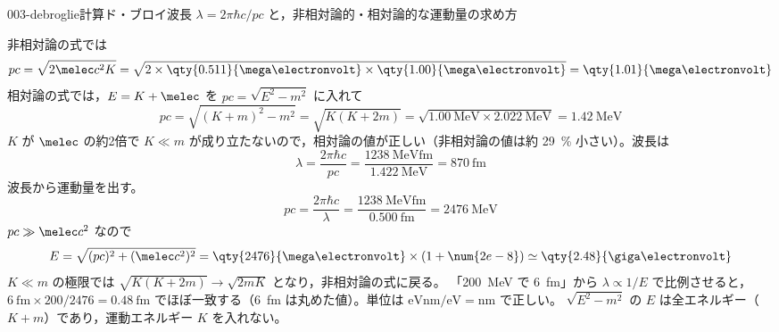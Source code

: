 \documentclass[uplatex,dvipdfmx,a4paper,11pt]{jsarticle}
\begin{document}
\begin{mondai}{003-debroglie}{計算}{ド・ブロイ波長 $\lambda=2\pi\hbar c/pc$ と，非相対論的・相対論的な運動量の求め方}
\begin{tadashii}
 非相対論の式では
\[ pc=\sqrt{2\melec c^2K}=\sqrt{2\times\qty{0.511}{\mega\electronvolt}\times\qty{1.00}{\mega\electronvolt}}=\qty{1.01}{\mega\electronvolt} \]
相対論の式では，$E=K+\melec$ を $pc=\sqrt{E^2-m^2}$ に入れて
\[ pc=\sqrt{(K+m)^2-m^2}=\sqrt{K(K+2m)}=\sqrt{\qty{1.00}{\mega\electronvolt}\times\qty{2.022}{\mega\electronvolt}}=\qty{1.42}{\mega\electronvolt} \]
$K$ が $\melec$ の約2倍で $K\ll m$ が成り立たないので，相対論の値が正しい（非相対論の値は約 \qty{29}{\percent} 小さい）。波長は
\[ \lambda=\frac{2\pi\hbar c}{pc}=\frac{\qty{1238}{\mega\electronvolt\femto\metre}}{\qty{1.422}{\mega\electronvolt}}=\qty{870}{\femto\metre} \]
 波長から運動量を出す。
\[ pc=\frac{2\pi\hbar c}{\lambda}=\frac{\qty{1238}{\mega\electronvolt\femto\metre}}{\qty{0.500}{\femto\metre}}=\qty{2476}{\mega\electronvolt} \]
$pc\gg\melec c^2$ なので
\[ E=\sqrt{(pc)^2+(\melec c^2)^2}=\qty{2476}{\mega\electronvolt}\times\left(1+\num{2e-8}\right)\simeq\qty{2.48}{\giga\electronvolt} \]
\kenzan {} $K\ll m$ の極限では $\sqrt{K(K+2m)}\to\sqrt{2mK}$ となり，非相対論の式に戻る。 「\qty{200}{\mega\electronvolt} で \qty{6}{\femto\metre}」から $\lambda\propto1/E$ で比例させると，$\qty{6}{\femto\metre}\times200/2476=\qty{0.48}{\femto\metre}$ でほぼ一致する（\qty{6}{\femto\metre} は丸めた値）。単位は $\unit{\electronvolt\nano\metre}/\unit{\electronvolt}=\unit{\nano\metre}$ で正しい。 %
\tsumazuki $\sqrt{E^2-m^2}$ の $E$ は全エネルギー（$K+m$）であり，運動エネルギー $K$ を入れない。
\end{tadashii}
\end{mondai}
\end{document}
